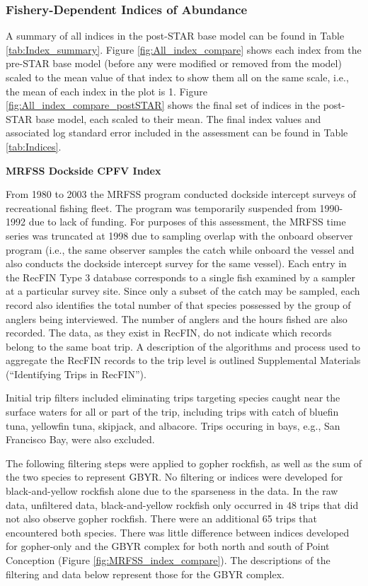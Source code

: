 \documentclass[12pt,]{article}
\begin{document}
\subsubsection{Fishery-Dependent Indices of
Abundance}\label{fishery-dependent-indices-of-abundance}

A summary of all indices in the post-STAR base model can be found in
Table \ref{tab:Index_summary}. Figure \ref{fig:All_index_compare} shows
each index from the pre-STAR base model (before any were modified or
removed from the model) scaled to the mean value of that index to show
them all on the same scale, i.e., the mean of each index in the plot is
1. Figure \ref{fig:All_index_compare_postSTAR} shows the final set of
indices in the post-STAR base model, each scaled to their mean. The
final index values and associated log standard error included in the
assessment can be found in Table \ref{tab:Indices}.

\textbf{MRFSS Dockside CPFV Index}

From 1980 to 2003 the MRFSS program conducted dockside intercept surveys
of recreational fishing fleet. The program was temporarily suspended
from 1990-1992 due to lack of funding. For purposes of this assessment,
the MRFSS time series was truncated at 1998 due to sampling overlap with
the onboard observer program (i.e., the same observer samples the catch
while onboard the vessel and also conducts the dockside intercept survey
for the same vessel). Each entry in the RecFIN Type 3 database
corresponds to a single fish examined by a sampler at a particular
survey site. Since only a subset of the catch may be sampled, each
record also identifies the total number of that species possessed by the
group of anglers being interviewed. The number of anglers and the hours
fished are also recorded. The data, as they exist in RecFIN, do not
indicate which records belong to the same boat trip. A description of
the algorithms and process used to aggregate the RecFIN records to the
trip level is outlined Supplemental Materials (``Identifying Trips in
RecFIN'').

Initial trip filters included eliminating trips targeting species caught
near the surface waters for all or part of the trip, including trips
with catch of bluefin tuna, yellowfin tuna, skipjack, and albacore.
Trips occuring in bays, e.g., San Francisco Bay, were also excluded.

The following filtering steps were applied to gopher rockfish, as well
as the sum of the two species to represent GBYR. No filtering or indices
were developed for black-and-yellow rockfish alone due to the sparseness
in the data. In the raw data, unfiltered data, black-and-yellow rockfish
only occurred in 48 trips that did not also observe gopher rockfish.
There were an additional 65 trips that encountered both species. There
was little difference between indices developed for gopher-only and the
GBYR complex for both north and south of Point Conception (Figure
\ref{fig:MRFSS_index_compare}). The descriptions of the filtering and
data below represent those for the GBYR complex.
\end{document}
